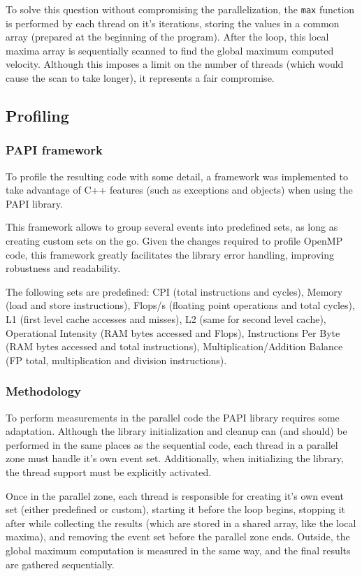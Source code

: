 \documentclass[9pt,twocolumn]{scrartcl}
\begin{document}
To solve this question without compromising the parallelization, the \texttt{max} function is performed by each thread on it's iterations, storing the values in a common array (prepared at the beginning of the program). After the loop, this local maxima array is sequentially scanned to find the global maximum computed velocity. Although this imposes a limit on the number of threads (which would cause the scan to take longer), it represents a fair compromise.

\subsection{Profiling}
\subsubsection{PAPI framework}%
To profile the resulting code with some detail, a framework was implemented to take advantage of C++ features (such as exceptions and objects) when using the PAPI library.

This framework allows to group several events into predefined sets, as long as creating custom sets on the go. Given the changes required to profile OpenMP code, this framework greatly facilitates the library error handling, improving robustness and readability.

The following sets are predefined: CPI (total instructions and cycles), Memory (load and store instructions), Flops/s (floating point operations and total cycles), L1 (first level cache accesses and misses), L2 (same for second level cache), Operational Intensity (RAM bytes accessed and Flops), Instructions Per Byte (RAM bytes accessed and total instructions), Multiplication/Addition Balance (FP total, multiplication and division instructions).

\subsubsection{Methodology}%
To perform measurements in the parallel code the PAPI library requires some adaptation. Although the library initialization and cleanup can (and should) be performed in the same places as the sequential code, each thread in a parallel zone must handle it's own event set. Additionally, when initializing the library, the thread support must be explicitly activated.

Once in the parallel zone, each thread is responsible for creating it's own event set (either predefined or custom), starting it before the loop begins, stopping it after while collecting the results (which are stored in a shared array, like the local maxima), and removing the event set before the parallel zone ends. Outside, the global maximum computation is measured in the same way, and the final	 results are gathered sequentially.
\end{document}
